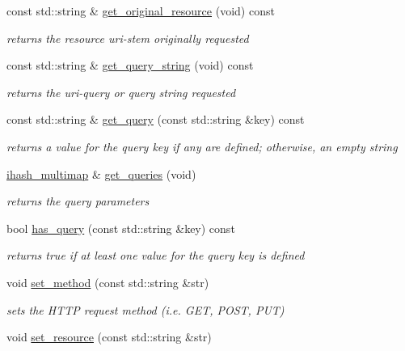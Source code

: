 \begin{DoxyCompactItemize}
const std\-::string \& \hyperlink{classpion_1_1http_1_1request_a79e8400cd9f7b956a4116b9bf218486b}{get\-\_\-original\-\_\-resource} (void) const 
\begin{DoxyCompactList}\small\item\em returns the resource uri-\/stem originally requested \end{DoxyCompactList}\item 
const std\-::string \& \hyperlink{classpion_1_1http_1_1request_a0a4f0e3f4ee577db353a55524efb3526}{get\-\_\-query\-\_\-string} (void) const 
\begin{DoxyCompactList}\small\item\em returns the uri-\/query or query string requested \end{DoxyCompactList}\item 
const std\-::string \& \hyperlink{classpion_1_1http_1_1request_aee545d0144035125655d0a4de441820a}{get\-\_\-query} (const std\-::string \&key) const 
\begin{DoxyCompactList}\small\item\em returns a value for the query key if any are defined; otherwise, an empty string \end{DoxyCompactList}\item 
\hyperlink{namespacepion_a2cd31d7bbe0e98008bd4e6f135103c0e}{ihash\-\_\-multimap} \& \hyperlink{classpion_1_1http_1_1request_a2e75b875b0858057b6b4bd6255f7424f}{get\-\_\-queries} (void)
\begin{DoxyCompactList}\small\item\em returns the query parameters \end{DoxyCompactList}\item 
bool \hyperlink{classpion_1_1http_1_1request_ac0da1fdcb02cf58ab0391d9f7955aeab}{has\-\_\-query} (const std\-::string \&key) const 
\begin{DoxyCompactList}\small\item\em returns true if at least one value for the query key is defined \end{DoxyCompactList}\item 
void \hyperlink{classpion_1_1http_1_1request_a0878aad94ef74810b8df2670a17c22b2}{set\-\_\-method} (const std\-::string \&str)
\begin{DoxyCompactList}\small\item\em sets the H\-T\-T\-P request method (i.\-e. G\-E\-T, P\-O\-S\-T, P\-U\-T) \end{DoxyCompactList}\item 
void \hyperlink{classpion_1_1http_1_1request_a421f57b069fd2442397dbcdb8c382a87}{set\-\_\-resource} (const std\-::string \&str)

\end{DoxyCompactItemize}
